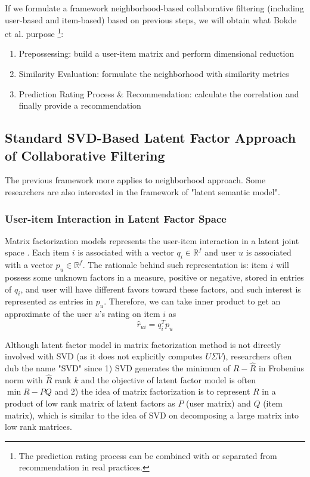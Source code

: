 \documentclass[letter paper, 11pt]{article}
\begin{document}
	If we formulate a framework neighborhood-based collaborative filtering (including user-based and item-based) based on previous steps, we will obtain what Bokde et al. purpose \cite{MF-Model-Survey}\footnote{The prediction rating process can be combined with or separated from recommendation in real practices.}:
	
	\begin{enumerate}
		\item Prepossessing:
		build a user-item matrix and perform dimensional reduction
		
		\item Similarity Evaluation:
		formulate the neighborhood with similarity metrics
		
		\item Prediction Rating Process \& Recommendation:
		calculate the correlation and finally provide a recommendation
	\end{enumerate}
	
	\subsection{Standard SVD-Based Latent Factor Approach of Collaborative Filtering} 
	The previous framework more applies to neighborhood approach. Some researchers are also interested in the framework of "latent semantic model". 
	
	\subsubsection{User-item Interaction in Latent Factor Space}
	Matrix factorization models represents the user-item interaction in a latent joint space \cite{MFinRS}. Each item $i$ is associated with a vector $q_i \in \mathbb{R}^f$ and user $u$ is associated with a vector $p_u \in \mathbb{R}^f$. The rationale behind such representation is: item $i$ will possess some unknown factors in a measure, positive or negative, stored in entries of $q_i$, and user will have different favors toward these factors, and such interest is represented as entries in $p_u$. Therefore, we can take inner product to get an approximate of the user $u$'s rating on item $i$ as \cite{MFinRS} 
	\begin{equation}
		\hat{r}_{ui} = q_i^T  p_u 
	\end{equation}
	
	
	Although latent factor model in matrix factorization method is not directly involved with SVD (as it does not explicitly computes $U \Sigma V$), researchers often dub the name "SVD" since 1) SVD generates the minimum of $R - \hat{R}$ in Frobenius norm with $\hat{R}$ rank $k$ and the objective of latent factor model is often $\min R - P Q$ and 2) the idea of matrix factorization is to represent $R$ in a product of low rank matrix of latent factors as $P$ (user matrix) and $Q$ (item matrix), which is similar to the idea of SVD on decomposing a large matrix into low rank matrices. 
	
\end{document}
